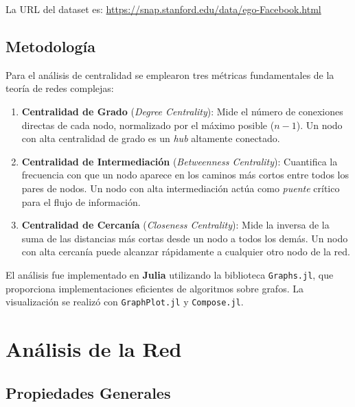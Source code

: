 \documentclass[12pt,a4paper,oneside,openany]{book}
\begin{document}
La URL del dataset es:
\url{https://snap.stanford.edu/data/ego-Facebook.html}

\section{Metodología}

Para el análisis de centralidad se emplearon tres métricas fundamentales de la teoría
de redes complejas:

\begin{enumerate}[leftmargin=1.5cm]
  \item \textbf{Centralidad de Grado} (\textit{Degree Centrality}):
    Mide el número de conexiones directas de cada nodo, normalizado por el máximo
    posible ($n-1$). Un nodo con alta centralidad de grado es un \textit{hub}
    altamente conectado.

  \item \textbf{Centralidad de Intermediación} (\textit{Betweenness Centrality}):
    Cuantifica la frecuencia con que un nodo aparece en los caminos
    más cortos entre todos los pares de nodos. Un nodo con alta
    intermediación actúa como \textit{puente} crítico para el flujo
    de información.

  \item \textbf{Centralidad de Cercanía} (\textit{Closeness Centrality}):
    Mide la inversa de la suma de las distancias más cortas desde un nodo a todos
    los demás. Un nodo con alta cercanía puede alcanzar rápidamente a cualquier
    otro nodo de la red.
\end{enumerate}

El análisis fue implementado en \textbf{Julia} utilizando la biblioteca
\texttt{Graphs.jl}, que proporciona implementaciones eficientes de algoritmos
sobre grafos. La visualización se realizó con \texttt{GraphPlot.jl} y
\texttt{Compose.jl}.


\chapter{Análisis de la Red}

\section{Propiedades Generales}
\end{document}
